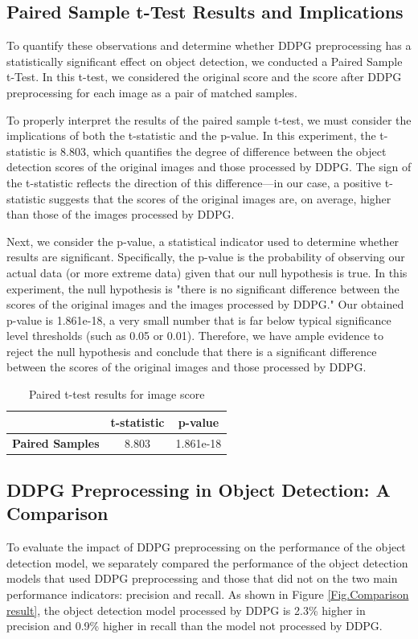 \documentclass{PHlab-thesis}
\begin{document}
\subsection{Paired Sample t-Test Results and Implications}
To quantify these observations and determine whether DDPG preprocessing has a statistically significant effect on object detection, we conducted a Paired Sample t-Test. In this t-test, we considered the original score and the score after DDPG preprocessing for each image as a pair of matched samples.

To properly interpret the results of the paired sample t-test, we must consider the implications of both the t-statistic and the p-value. In this experiment, the t-statistic is 8.803, which quantifies the degree of difference between the object detection scores of the original images and those processed by DDPG. The sign of the t-statistic reflects the direction of this difference—in our case, a positive t-statistic suggests that the scores of the original images are, on average, higher than those of the images processed by DDPG.

Next, we consider the p-value, a statistical indicator used to determine whether results are significant. Specifically, the p-value is the probability of observing our actual data (or more extreme data) given that our null hypothesis is true. In this experiment, the null hypothesis is "there is no significant difference between the scores of the original images and the images processed by DDPG." Our obtained p-value is 1.861e-18, a very small number that is far below typical significance level thresholds (such as 0.05 or 0.01). Therefore, we have ample evidence to reject the null hypothesis and conclude that there is a significant difference between the scores of the original images and those processed by DDPG.

\begin{table}[H]
    \centering
    \label{table:t_test_results} 
    \begin{tabular}{c c c}
        \toprule
        & \textbf{t-statistic} & \textbf{p-value} \\
        \midrule
        \textbf{Paired Samples} & 8.803 & 1.861e-18 \\
        \bottomrule
    \end{tabular}
    \caption{Paired t-test results for image score}
\end{table}

\subsection{DDPG Preprocessing in Object Detection: A Comparison}
To evaluate the impact of DDPG preprocessing on the performance of the object detection model, we separately compared the performance of the object detection models that used DDPG preprocessing and those that did not on the two main performance indicators: precision and recall. As shown in Figure \ref{Fig.Comparison result}, the object detection model processed by DDPG is 2.3\% higher in precision and 0.9\% higher in recall than the model not processed by DDPG.
\end{document}

